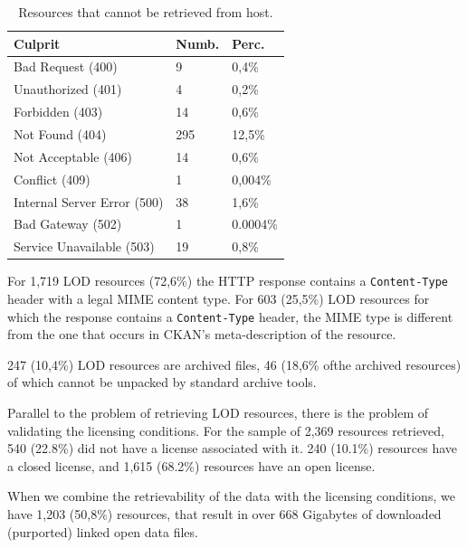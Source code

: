 \begin{table}
  \centering
  \caption{Resources that cannot be retrieved from host.}
  \label{tab:retrievability}
  \begin{tabular}{|l|l|l|}
    \hline
    \textbf{Culprit} & \textbf{Numb.} & \textbf{Perc.} \\
    \hline
    \hline
    Bad Request (400) & 9 & 0,4\% \\
    \hline
    Unauthorized (401) & 4 & 0,2\% \\
    \hline
    Forbidden (403) & 14 & 0,6\% \\
    \hline
    Not Found (404) & 295 & 12,5\% \\
    \hline
    Not Acceptable (406) & 14 & 0,6\% \\
    \hline
    Conflict (409) & 1 & 0,004\% \\
    \hline
    Internal Server Error (500) & 38 & 1,6\% \\
    \hline
    Bad Gateway (502) & 1 & 0.0004\% \\
    \hline
    Service Unavailable (503) & 19 & 0,8\% \\
    \hline
  \end{tabular}
\end{table}

For 1,719 LOD resources (72,6\%) the HTTP response contains
 a \texttt{Content-Type} header with a legal MIME content type.
For 603 (25,5\%) LOD resources for which the response contains
 a \newline\texttt{Content-Type} header,
 the MIME type is different from the one that occurs
 in CKAN's meta-description of the resource.

247 (10,4\%) LOD resources are archived files,
 46 (18,6\% ofthe archived resources) of which cannot be unpacked
 by standard archive tools.

Parallel to the problem of retrieving LOD resources,
 there is the problem of validating the licensing conditions.
For the sample of 2,369 resources \obs retrieved,
 540 (22.8\%) did not have a license associated with it.
 240 (10.1\%) resources have a closed license,
 and 1,615 (68.2\%) resources have an open license.

When we combine the retrievability of the data with the licensing conditions,
 we have 1,203 (50,8\%) resources,
 that result in over 668 Gigabytes of
 downloaded (purported) linked open data files.

